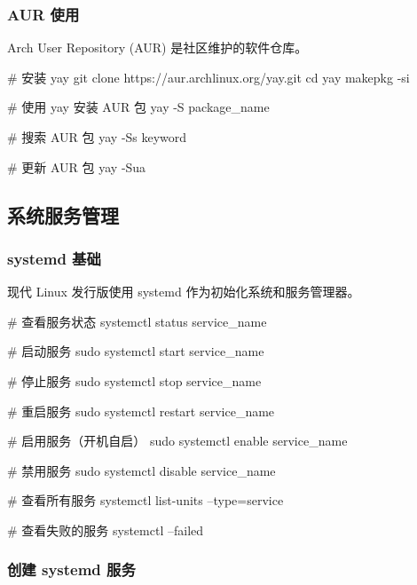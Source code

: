 \subsubsection{AUR 使用}

Arch User Repository (AUR) 是社区维护的软件仓库。


\begin{lstcode}[numbers=none]
  # 安装 yay
  git clone https://aur.archlinux.org/yay.git
  cd yay
  makepkg -si

  # 使用 yay 安装 AUR 包
  yay -S package_name

  # 搜索 AUR 包
  yay -Ss keyword

  # 更新 AUR 包
  yay -Sua
\end{lstcode}

\subsection{系统服务管理}

\subsubsection{systemd 基础}

现代 Linux 发行版使用 systemd 作为初始化系统和服务管理器。


\begin{lstcode}[numbers=none]
  # 查看服务状态
  systemctl status service_name

  # 启动服务
  sudo systemctl start service_name

  # 停止服务
  sudo systemctl stop service_name

  # 重启服务
  sudo systemctl restart service_name

  # 启用服务（开机自启）
  sudo systemctl enable service_name

  # 禁用服务
  sudo systemctl disable service_name

  # 查看所有服务
  systemctl list-units --type=service

  # 查看失败的服务
  systemctl --failed
\end{lstcode}

\subsubsection{创建 systemd 服务}


